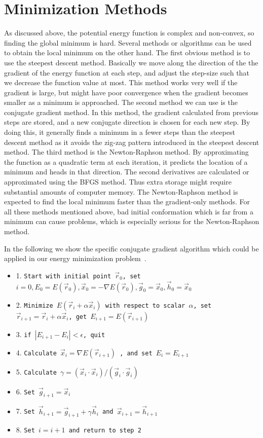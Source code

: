 \section{Minimization Methods}
As discussed above, the potential energy function is complex and non-convex, so finding the global minimum is hard. Several methods or algorithms
can be used to obtain the local minimum on the other hand. The first obvious method is to use the steepest descent method. Basically we move 
along the direction of the the gradient of the energy function at each step, and adjust the step-size such that we decrease the function value at most.
This method works very well if the gradient is large, but might have poor convergence when the gradient becomes smaller as a minimum is approached.
The second method we can use is the conjugate gradient method. In this method, the gradient calculated from previous steps are stored, and a new
conjugate direction is chosen for each new step. By doing this, it generally finds a minimum in a fewer steps than the steepest descent method as it
avoids the zig-zag pattern introduced in the steepest descent method. The third method is the Newton-Raphson method. By approximating the function as 
a quadratic term at each iteration, it predicts the location of a minimum and heads in that direction. The second derivatives are calculated or approximated
using the BFGS method. Thus extra storage might require substantial amounts of computer memory.  The Newton-Raphson method is expected to find
 the local minimum faster than the gradient-only methods. For all these methods mentioned above, bad initial conformation which is far from a
minimum can cause problems, which is especially serious for the Newton-Raphson method.


In the following we show the specific conjugate gradient algorithm which could be applied in our energy minimization problem~\cite{conjucate}. 
\begin{itemize}
\item 1. \texttt{Start with initial point $\vec{r}_0$, set $i=0, E_0=E(\vec{r}_0), \vec{x}_0 = -\nabla E(\vec{r}_0), \vec{g}_0=\vec{x}_0, \vec{h}_0=\vec{x}_0$  }
\item 2. \texttt{Minimize $E(\vec{r}_i+\alpha \vec{x}_i)$ with respect to scalar $\alpha$, set $\vec{r}_{i+1}= \vec{r}_i +\alpha \vec{x}_i$, get $E_{i+1}= E(\vec{r}_{i+1})$ }
\item 3. \texttt{if $|E_{i+1} - E_{i}| < \epsilon$, quit }
\item 4. \texttt{Calculate $\vec{x}_i=\nabla E(\vec{r}_{i+1})$ , and set $E_i=E_{i+1}$}
\item 5. \texttt{Calculate $\gamma = (\vec{x}_i\cdot \vec{x}_i)/(\vec{g}_i\cdot \vec{g}_i)$  }
\item 6. \texttt{Set $\vec{g}_{i+1} = \vec{x}_i$}
\item 7. \texttt{Set $\vec{h}_{i+1} = \vec{g}_{i+1} +\gamma \vec{h}_i$ and $\vec{x}_{i+1} =\vec{h}_{i+1}$}
\item 8. \texttt{Set $i=i+1$ and return to step 2 } 
\end{itemize}

